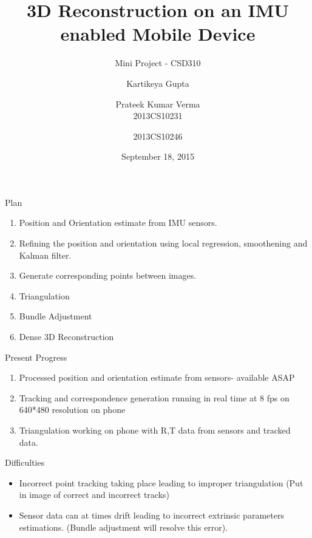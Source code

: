 \documentclass{beamer}
\title[3D reconstruction]{3D Reconstruction on an IMU enabled Mobile Device}
\subtitle{Mini Project - CSD310}
\author[Kartikeya \and Prateek]{\hspace{.063\textwidth} Kartikeya Gupta \and Prateek Kumar Verma \\\small 2013CS10231 \hspace{.1\textwidth} \and \small 2013CS10246}
\institute[IITD] %
{
  Department of Computer Science and Engineering\\
  IIT Delhi
  \and
  Under supervision of \\
  \textbf{Prof. Subhashis Banerjee} \\
  Department of Computer Science and Engineering
}
\date{September 18, 2015}
\begin{document}
\begin{frame}
  \titlepage
\end{frame}




\begin{frame}{Plan}{}
  \begin{enumerate}
  	\item Position and Orientation estimate from IMU sensors.
  	\item Refining the position and orientation using local regression, smoothening and Kalman filter.
  	\item Generate corresponding points between images.
  	\item Triangulation
  	\item Bundle Adjustment
  	\item Dense 3D Reconstruction
  \end{enumerate}
\end{frame}

\begin{frame}{Present Progress}{}
	\begin{enumerate}
		\item Processed position and orientation estimate from sensors- available ASAP
		\item Tracking and correspondence generation running in real time at 8 fps on 640*480 resolution on phone
		\item Triangulation working on phone with R,T data from sensors and tracked data.
	\end{enumerate}
\end{frame}

\begin{frame}{Difficulties}{}
	\begin{itemize}
		\item Incorrect point tracking taking place leading to improper triangulation (Put in image of correct and incorrect tracks)
		\item Sensor data can at times drift leading to incorrect extrinsic parameters estimations. (Bundle adjustment will resolve this error).
	\end{itemize}
\end{frame}
\end{document}
